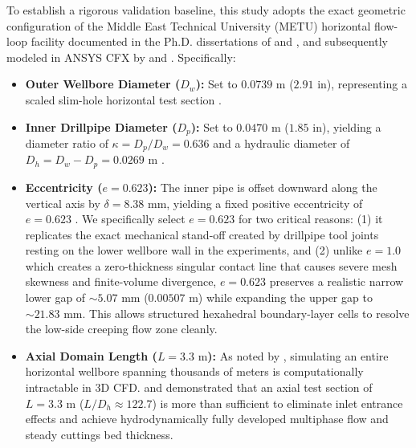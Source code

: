 To establish a rigorous validation baseline, this study adopts the exact geometric configuration of the Middle East Technical University (METU) horizontal flow-loop facility documented in the Ph.D. dissertations of \citet{Osgouei2010} and \citet{Sorgun2010}, and subsequently modeled in ANSYS CFX by \citet{Shehab2015} and \citet{Ofei2015}. Specifically:
\begin{itemize}
    \item \textbf{Outer Wellbore Diameter ($D_w$):} Set to $0.0739\text{ m}$ ($2.91\text{ in}$), representing a scaled slim-hole horizontal test section \citep{Osgouei2010, Shehab2015}.
    \item \textbf{Inner Drillpipe Diameter ($D_p$):} Set to $0.0470\text{ m}$ ($1.85\text{ in}$), yielding a diameter ratio of $\kappa = D_p/D_w = 0.636$ and a hydraulic diameter of $D_h = D_w - D_p = 0.0269\text{ m}$ \citep{Osgouei2010, Shehab2015}.
    \item \textbf{Eccentricity ($e = 0.623$):} The inner pipe is offset downward along the vertical axis by $\delta = 8.38\text{ mm}$, yielding a fixed positive eccentricity of $e = 0.623$ \citep{Osgouei2010, Shehab2015}. We specifically select $e = 0.623$ for two critical reasons: (1) it replicates the exact mechanical stand-off created by drillpipe tool joints resting on the lower wellbore wall in the \citet{Osgouei2010} experiments, and (2) unlike $e = 1.0$ which creates a zero-thickness singular contact line that causes severe mesh skewness and finite-volume divergence, $e = 0.623$ preserves a realistic narrow lower gap of $\sim 5.07\text{ mm}$ ($0.00507\text{ m}$) while expanding the upper gap to $\sim 21.83\text{ mm}$. This allows structured hexahedral boundary-layer cells to resolve the low-side creeping flow zone cleanly.
    \item \textbf{Axial Domain Length ($L = 3.3\text{ m}$):} As noted by \citet{Hajipour2020}, simulating an entire horizontal wellbore spanning thousands of meters is computationally intractable in 3D CFD. \citet{Osgouei2010} and \citet{Shehab2015} demonstrated that an axial test section of $L = 3.3\text{ m}$ ($L/D_h \approx 122.7$) is more than sufficient to eliminate inlet entrance effects and achieve hydrodynamically fully developed multiphase flow and steady cuttings bed thickness.
\end{itemize}

